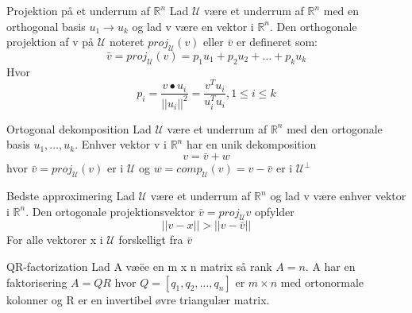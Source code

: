 \documentclass[a4paper,fleqn]{article}
\newcommand{\RR}{\mathbb{R}}
\newcommand{\U}{\mathcal{U}}
\begin{document}
	\begin{definition}{Projektion på et underrum af $\RR^n$}{}
		Lad $\U$ være et underrum af $\RR^n$ med en orthogonal basis $u_1 \rightarrow u_k$
		og lad v være en vektor i $\RR^n$. Den orthogonale projektion af v på $\U$
		noteret $proj_\U(v)$ eller $\bar{v}$ er defineret som:
		\[\bar{v} = proj_\U(v) = p_1u_1 + p_2u_2+\dots+p_ku_k\]
		Hvor
		\[p_i = \frac{v\bullet u_i}{||u_i||^2} = \frac{v^Tu_i}{u_i^Tu_i}, 1 \leq i \leq k\]
	\end{definition}
	\begin{theorem}{Ortogonal dekomposition}{}
		Lad $\U$ være et underrum af $\RR^n$ med den ortogonale basis $u_1,\dots,u_k$.
		Enhver vektor v i $\RR^n$ har en unik dekomposition \[v = \bar{v}+w\] hvor
		$\bar{v} = proj_\U(v)$ er i $\U$ og $w = comp_\U(v) = v-\bar{v}$ er i $\U^\perp$
	\end{theorem}
	\begin{theorem}{Bedste approximering}{}
		Lad $\U$ være et underrum af $\RR^n$ og lad v være enhver vektor i $\RR^n$. Den
		ortogonale projektionsvektor $\bar{v} = proj_\U v$ opfylder
		\[ ||v-x|| > ||v-\bar{v}|| \]
		For alle vektorer x i $\U$ forskelligt fra $\bar{v}$
	\end{theorem}
	\begin{theorem}{QR-factorization}{}
		Lad A væëe en m x n matrix så rank $A = n$. A har en faktorisering $A = QR$ hvor
		$Q = [q_1,q_2,\dots,q_n]$ er $m \times n$ med ortonormale kolonner og R er en
		invertibel øvre triangulær matrix.
	\end{theorem}
\end{document}

